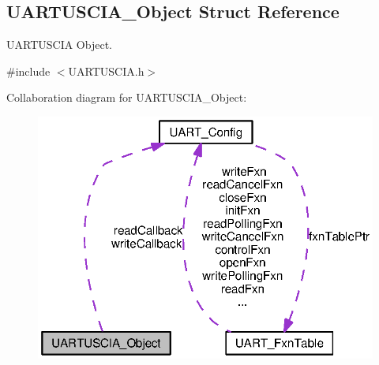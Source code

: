 \subsection{U\+A\+R\+T\+U\+S\+C\+I\+A\+\_\+\+Object Struct Reference}
\label{struct_u_a_r_t_u_s_c_i_a___object}


U\+A\+R\+T\+U\+S\+C\+I\+A Object.  




{\ttfamily \#include $<$U\+A\+R\+T\+U\+S\+C\+I\+A.\+h$>$}



Collaboration diagram for U\+A\+R\+T\+U\+S\+C\+I\+A\+\_\+\+Object\+:
\nopagebreak
\begin{figure}[H]
\begin{center}
\leavevmode
\includegraphics[width=319pt]{struct_u_a_r_t_u_s_c_i_a___object__coll__graph}
\end{center}
\end{figure}
